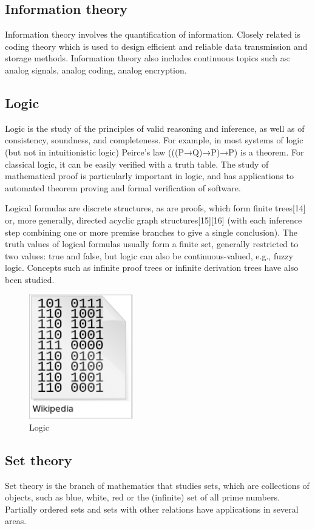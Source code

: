\documentclass{article}
\begin{document}
\subsection{Information theory}
Information theory involves the quantification of information. Closely related is coding theory which is used to design efficient and reliable data transmission and storage methods. Information theory also includes continuous topics such as: analog signals, analog coding, analog encryption.
\subsection{Logic}
Logic is the study of the principles of valid reasoning and inference, as well as of consistency, soundness, and completeness. For example, in most systems of logic (but not in intuitionistic logic) Peirce's law (((P→Q)→P)→P) is a theorem. For classical logic, it can be easily verified with a truth table. The study of mathematical proof is particularly important in logic, and has applications to automated theorem proving and formal verification of software.

Logical formulas are discrete structures, as are proofs, which form finite trees[14] or, more generally, directed acyclic graph structures[15][16] (with each inference step combining one or more premise branches to give a single conclusion). The truth values of logical formulas usually form a finite set, generally restricted to two values: true and false, but logic can also be continuous-valued, e.g., fuzzy logic. Concepts such as infinite proof trees or infinite derivation trees have also been studied.
\begin{figure}[h]
\includegraphics[width=0.4\textwidth]{sc.png}
\caption{Logic}
\end{figure}
\subsection{Set theory} 
Set theory is the branch of mathematics that studies sets, which are collections of objects, such as {blue, white, red} or the (infinite) set of all prime numbers. Partially ordered sets and sets with other relations have applications in several areas.
\end{document}
